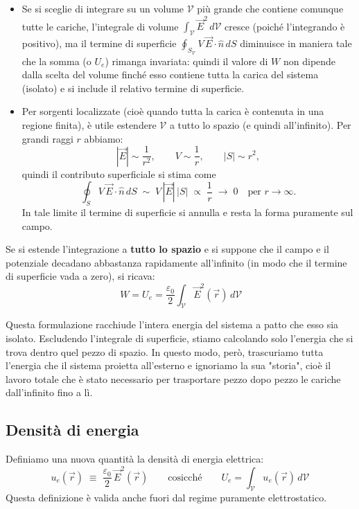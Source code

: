 \documentclass{book}
\begin{document}
\begin{itemize}
\item Se si sceglie di integrare su un volume \(\mathcal V\) più grande che contiene comunque tutte le cariche, l'integrale di volume \(\int_{\mathcal V}\vec E^2\,d\mathcal V\) cresce (poiché l'integrando è positivo), ma il termine di superficie \(\oint_{S_{\mathcal V}} V\,\vec E\cdot\hat n\,dS\) diminuisce in maniera tale che la somma (o $U_e$) rimanga invariata: quindi il valore di \(W\) non dipende dalla scelta del volume finché esso contiene tutta la carica del sistema (isolato) e si include il relativo termine di superficie.
\item Per sorgenti localizzate (cioè quando tutta la carica è contenuta in una regione finita), è utile estendere \(\mathcal V\) a tutto lo spazio (e quindi all'infinito). Per grandi raggi \(r\) abbiamo:
  \[
  |\vec E|\sim \frac{1}{r^2},\qquad V\sim\frac{1}{r},\qquad |S|\sim r^2,
  \]
  quindi il contributo superficiale si stima come
  \[
  \oint_{S} V\,\vec E\cdot\hat n\,dS \;\sim\; V \,|\vec E|\,|S| \;\propto\; \frac{1}{r}\;\longrightarrow\; 0
  \quad\text{per }r\to\infty.
  \]
 In tale limite il termine di superficie si annulla e resta la forma puramente sul campo.
\end{itemize}

Se si estende l'integrazione a \textbf{tutto lo spazio} e si suppone che il campo e il potenziale decadano abbastanza rapidamente all'infinito (in modo che il termine di superficie vada a zero), si ricava:
\[
\boxed{\,W = U_e = \frac{\varepsilon_0}{2}\int_{\mathcal{V}}\vec E^2(\vec r)\,d \mathcal{V}}
\]

Questa formulazione racchiude l'intera energia del sistema a patto che esso sia isolato.
Escludendo l'integrale di superficie, stiamo calcolando solo l'energia che si trova dentro quel pezzo di spazio. In questo modo, però, trascuriamo tutta l'energia che il sistema proietta all'esterno e ignoriamo la sua "storia", cioè il lavoro totale che è stato necessario per trasportare pezzo dopo pezzo le cariche dall'infinito fino a lì.
\subsection*{Densità di energia}

Definiamo una nuova quantità la densità di energia elettrica:
\[
u_e(\vec r)\;\equiv\; \frac{\varepsilon_0}{2}\,\vec E^2(\vec r)
\qquad\text{cosicché}\qquad
U_e=\int_{\mathcal{V}}u_e(\vec r)\,d \mathcal{V}
\]
Questa definizione è valida anche fuori dal regime puramente elettrostatico.
\end{document}
